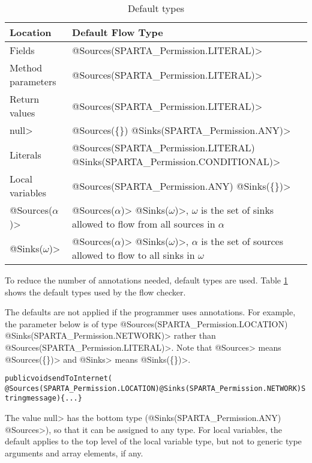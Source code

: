 \begin{table}[h]
    \begin{tabular}{ll}
    \toprule
\bf{Location}&\bf{Default Flow Type}\\
\midrule 
    Fields &  \<@Sources(SPARTA_Permission.LITERAL)> \\ 
    Method parameters &  \<@Sources(SPARTA_Permission.LITERAL)> \\ 
    Return values &  \<@Sources(SPARTA_Permission.LITERAL)> \\ 
    \<null> &  \<@Sources(\{\}) @Sinks(SPARTA_Permission.ANY)>\\ 
    Literals & \<@Sources(SPARTA_Permission.LITERAL) @Sinks(SPARTA_Permission.CONDITIONAL)>\\ 
   Local variables  &   \<@Sources(SPARTA_Permission.ANY) @Sinks(\{\})> \\ 
   \<@Sources($\alpha$)>&\<@Sources($\alpha$)>
   \<@Sinks($\omega$)>,  $\omega$ is the set of  sinks allowed to flow from all sources in $\alpha$ \\ 
      \<@Sinks($\omega$)>&\<@Sources($\alpha$)>
      \<@Sinks($\omega$)>, $\alpha$ is the set of  sources allowed to flow to all sinks in $\omega$ \\ 
      
      \bottomrule
    \end{tabular}
    \caption{Default types}\label{table:defaults}
\end{table}


To reduce the number of annotations needed, default types are
used. Table \ref{table:defaults} shows the default types used by the
flow checker.


The defaults are not applied if the programmer uses annotations.  For
example, the parameter below is of type
\<@Sources(SPARTA_Permission.LOCATION) @Sinks(SPARTA_Permission.NETWORK)>
rather than  \<@Sources({SPARTA_Permission.LITERAL})>. Note that \<@Sources>
means \<@Sources(\{\})> and \<@Sinks>  means \<@Sinks(\{\})>.
\begin{alltt}
public void sendToInternet(
    @Sources(SPARTA_Permission.LOCATION) @Sinks(SPARTA_Permission.NETWORK) String message)\{...\}
\end{alltt} 

The value \<null> has the bottom type (\<@Sinks(SPARTA_Permission.ANY)
@Sources>),
so that it can be assigned to any type. For local variables, the
default applies to the top level of the local variable type, but not
to generic type arguments and array elements, if any.

